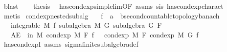 \begin{isabellebody}
\ blast\isanewline
\ \ \isamarkupfalse%
\ {\isacharquery}{\kern0pt}thesis\ \isamarkupfalse%
\ has{\isacharunderscore}{\kern0pt}cond{\isacharunderscore}{\kern0pt}exp{\isacharunderscore}{\kern0pt}simple{\isacharunderscore}{\kern0pt}lim{\isacharbrackleft}{\kern0pt}OF\ assms\ s{\isacharunderscore}{\kern0pt}is{\isacharbrackright}{\kern0pt}\ has{\isacharunderscore}{\kern0pt}cond{\isacharunderscore}{\kern0pt}exp{\isacharunderscore}{\kern0pt}charact{\isacharparenleft}{\kern0pt}{}{\isacharparenright}{\kern0pt}\ \isamarkupfalse%
\ metis\isanewline
{}\isamarkupfalse%
%
\endisatagproof
{\isafoldproof}%
%
\isadelimproof
%
\endisadelimproof
%
\isadelimdocument
%
\endisadelimdocument
%
\isatagdocument
%
\isamarkuptrue%
%
\endisatagdocument
{\isafolddocument}%
%
\isadelimdocument
%
\endisadelimdocument
{}\isamarkupfalse%
\ cond{\isacharunderscore}{\kern0pt}exp{\isacharunderscore}{\kern0pt}nested{\isacharunderscore}{\kern0pt}subalg{\isacharcolon}{\kern0pt}\isanewline
\ \ \ f\ {\isacharcolon}{\kern0pt}{\isacharcolon}{\kern0pt}\ {\isachardoublequoteopen}{\isacharprime}{\kern0pt}a\ {\isasymRightarrow}\ {\isacharprime}{\kern0pt}b{\isacharcolon}{\kern0pt}{\isacharcolon}{\kern0pt}{\isacharbraceleft}{\kern0pt}second{\isacharunderscore}{\kern0pt}countable{\isacharunderscore}{\kern0pt}topology{\isacharcomma}{\kern0pt}banach{\isacharbraceright}{\kern0pt}{\isachardoublequoteclose}\isanewline
\ \ \ {\isachardoublequoteopen}integrable\ M\ f{\isachardoublequoteclose}\ {\isachardoublequoteopen}subalgebra\ M\ G{\isachardoublequoteclose}\ {\isachardoublequoteopen}subalgebra\ G\ F{\isachardoublequoteclose}\isanewline
\ \ \ {\isachardoublequoteopen}AE\ {\isasymxi}\ in\ M{\isachardot}{\kern0pt}\ cond{\isacharunderscore}{\kern0pt}exp\ M\ F\ f\ {\isasymxi}\ {\isacharequal}{\kern0pt}\ cond{\isacharunderscore}{\kern0pt}exp\ M\ F\ {\isacharparenleft}{\kern0pt}cond{\isacharunderscore}{\kern0pt}exp\ M\ G\ f{\isacharparenright}{\kern0pt}\ {\isasymxi}{\isachardoublequoteclose}\isanewline
%
\isadelimproof
\ \ %
\endisadelimproof
%
\isatagproof
{}\isamarkupfalse%
\ has{\isacharunderscore}{\kern0pt}cond{\isacharunderscore}{\kern0pt}expI\ assms\ sigma{\isacharunderscore}{\kern0pt}finite{\isacharunderscore}{\kern0pt}subalgebra{\isacharunderscore}{\kern0pt}def\ \isamarkupfalse%

\end{isabellebody}
